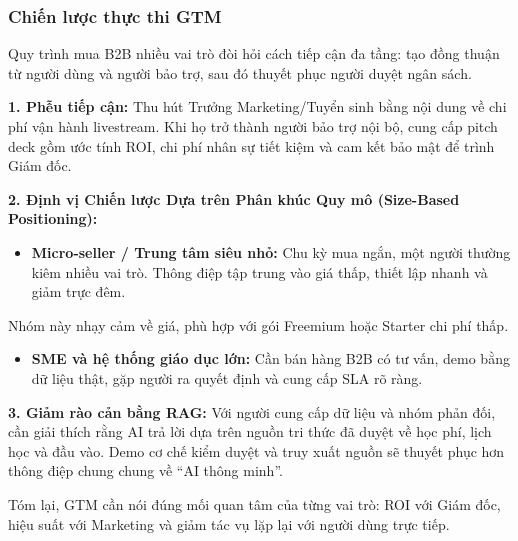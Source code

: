 \subsubsection{Chiến lược thực thi GTM}

Quy trình mua B2B nhiều vai trò đòi hỏi cách tiếp cận đa tầng: tạo đồng thuận từ người dùng và người bảo trợ, sau đó thuyết phục người duyệt ngân sách.

\textbf{1. Phễu tiếp cận:} Thu hút Trưởng Marketing/Tuyển sinh bằng nội dung về chi phí vận hành livestream. Khi họ trở thành người bảo trợ nội bộ, cung cấp pitch deck gồm ước tính ROI, chi phí nhân sự tiết kiệm và cam kết bảo mật để trình Giám đốc.

\textbf{2. Định vị Chiến lược Dựa trên Phân khúc Quy mô (Size-Based Positioning):}

\begin{itemize}
    \item \textbf{Micro-seller / Trung tâm siêu nhỏ:} Chu kỳ mua ngắn, một người thường kiêm nhiều vai trò. Thông điệp tập trung vào giá thấp, thiết lập nhanh và giảm trực đêm.
\end{itemize}

\begin{WarningBox}
Nhóm này nhạy cảm về giá, phù hợp với gói Freemium hoặc Starter chi phí thấp.
\end{WarningBox}

\begin{itemize}
    \item \textbf{SME và hệ thống giáo dục lớn:} Cần bán hàng B2B có tư vấn, demo bằng dữ liệu thật, gặp người ra quyết định và cung cấp SLA rõ ràng.
\end{itemize}

\textbf{3. Giảm rào cản bằng RAG:} Với người cung cấp dữ liệu và nhóm phản đối, cần giải thích rằng AI trả lời dựa trên nguồn tri thức đã duyệt về học phí, lịch học và đầu vào. Demo cơ chế kiểm duyệt và truy xuất nguồn sẽ thuyết phục hơn thông điệp chung chung về ``AI thông minh''.

Tóm lại, GTM cần nói đúng mối quan tâm của từng vai trò: ROI với Giám đốc, hiệu suất với Marketing và giảm tác vụ lặp lại với người dùng trực tiếp.

